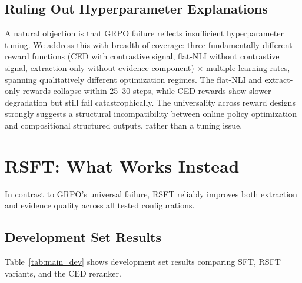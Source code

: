 \documentclass[11pt,a4paper]{article}
\begin{document}
\subsection{Ruling Out Hyperparameter Explanations}

A natural objection is that GRPO failure reflects insufficient hyperparameter tuning.
We address this with breadth of coverage: three fundamentally different reward functions (CED with contrastive signal, flat-NLI without contrastive signal, extraction-only without evidence component) $\times$ multiple learning rates, spanning qualitatively different optimization regimes.
The flat-NLI and extract-only rewards collapse within 25--30 steps, while CED rewards show slower degradation but still fail catastrophically.
The universality across reward designs strongly suggests a structural incompatibility between online policy optimization and compositional structured outputs, rather than a tuning issue.

\section{RSFT: What Works Instead}
\label{sec:rsft_results}

In contrast to GRPO's universal failure, RSFT reliably improves both extraction and evidence quality across all tested configurations.

\subsection{Development Set Results}

Table~\ref{tab:main_dev} shows development set results comparing SFT, RSFT variants, and the CED reranker.
\end{document}
